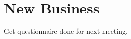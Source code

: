 \documentclass[11pt]{meetingmins}
\begin{document}
\section{New Business}
\begin{items}
\item
Get questionnaire done for next meeting.

\item


\end{items}

\vspace{1em}
\end{document}
